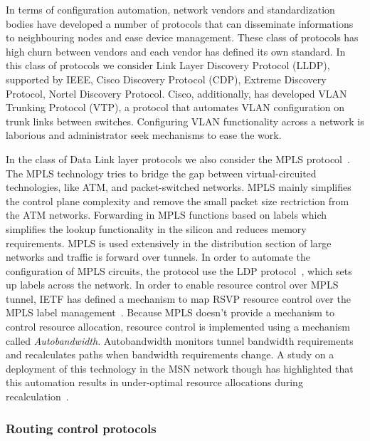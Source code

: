 In terms of configuration automation, network vendors and standardization bodies
have developed a number of protocols that can disseminate informations to
neighbouring nodes and ease device management. These class of protocols has high
churn between vendors and each vendor has defined its own standard. In this
class of protocols we consider Link Layer Discovery Protocol (LLDP), supported
by IEEE, Cisco Discovery Protocol (CDP),  Extreme Discovery Protocol, Nortel
Discovery Protocol. Cisco, additionally, has developed VLAN Trunking Protocol
(VTP), a protocol that automates VLAN configuration on trunk links between
switches. Configuring VLAN functionality across a network is laborious and
administrator seek mechanisms to ease the work.

In the class of Data Link layer protocols we also consider the MPLS
protocol~\cite{RFC3031}. The MPLS technology tries to bridge the gap between
virtual-circuited technologies, like ATM, and packet-switched networks. MPLS
mainly simplifies the control plane complexity and remove the small packet size
rectriction from the ATM networks. Forwarding in MPLS functions based on labels
which simplifies the lookup functionality in the silicon and reduces memory
requirements. MPLS is used extensively in the distribution section of large
networks and traffic is forward over tunnels. In order to automate the
configuration of MPLS circuits, the protocol use the LDP protocol~\cite{RFC5036}, 
which sets up labels across the network. In order to enable resource control
over MPLS tunnel, IETF has defined a mechanism to map RSVP resource control
over the MPLS label management~\cite{RFC3209}.  Because MPLS doesn't provide a
mechanism to control resource allocation, resource control is implemented using
a mechanism called {\it Autobandwidth}. Autobandwidth monitors tunnel bandwidth
requirements and recalculates paths when bandwidth requirements change. A study
on a deployment of this technology in the MSN network though has highlighted
that this automation results in under-optimal resource allocations during
recalculation~\cite{Pathak2011}.


\subsubsection{Routing control protocols}

